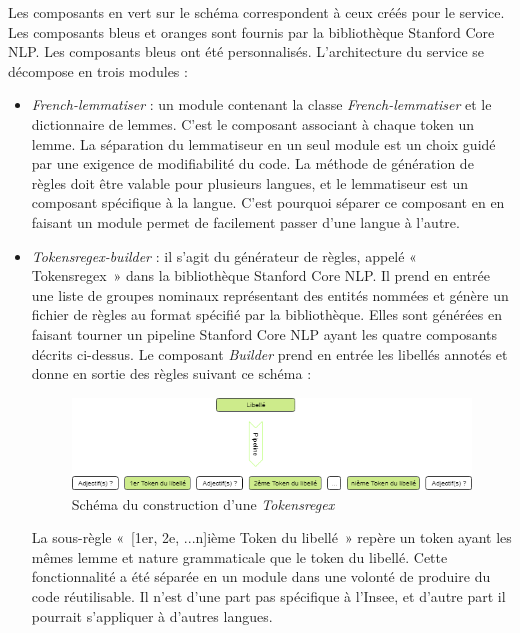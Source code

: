 Les composants en vert sur le schéma correspondent à ceux créés pour le service. Les composants bleus et oranges sont fournis par la bibliothèque Stanford Core NLP. Les composants bleus ont été personnalisés. L'architecture du service se décompose en trois modules : 
\begin{itemize}
    \item \textit{French-lemmatiser} : un module contenant la classe \textit{French-lemmatiser} et le dictionnaire de lemmes. C'est le composant associant à chaque token un lemme. La séparation du lemmatiseur en un seul module est un choix guidé par une exigence de modifiabilité du code. La méthode de génération de règles doit être valable pour plusieurs langues, et le lemmatiseur est un composant spécifique à la langue. C'est pourquoi séparer ce composant en en faisant un module permet de facilement passer d'une langue à l'autre.
    \vspace{5pt}
    \item \textit{Tokensregex-builder} : il s'agit du générateur de règles, appelé «~ Tokensregex~» dans la bibliothèque Stanford Core NLP. Il prend en entrée une liste de groupes nominaux représentant des entités nommées et génère un fichier de règles au format spécifié par la bibliothèque. Elles sont générées en faisant tourner un pipeline Stanford Core NLP ayant les quatre composants décrits ci-dessus. Le composant \textit{Builder} prend en entrée les libellés annotés et donne en sortie des règles suivant ce schéma : 
    \vspace{10pt}
    \begin{figure}[H]
        \centering
        \includegraphics[scale=0.6]{images/Exemple-tokensregex.png}
        \caption{Schéma du construction d'une \textit{Tokensregex}}
        \label{fig:schema-tokensregex}
    \end{figure}
    \vspace{10pt}
    La sous-règle «~[1er, 2e, ...n]ième Token du libellé~» repère un token ayant les mêmes lemme et nature grammaticale que le token du libellé. Cette fonctionnalité a été séparée en un module dans une volonté de produire du code réutilisable. Il n'est d'une part pas spécifique à l'Insee, et d'autre part il pourrait s'appliquer à d'autres langues.

\end{itemize}
